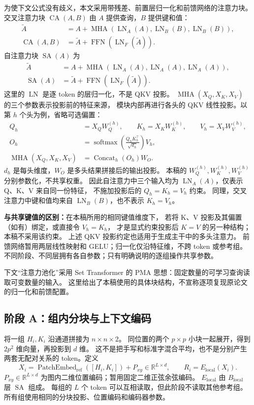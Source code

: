 \documentclass[UTF8,fontset=fandol,zihao=5,a4paper]{ctexart}
\newcommand{\R}{\mathbb R}
\newcommand{\LN}{\operatorname{LN}}
\newcommand{\SA}{\operatorname{SA}}
\newcommand{\CA}{\operatorname{CA}}
\newcommand{\FFN}{\operatorname{FFN}}
\newcommand{\MHA}{\operatorname{MHA}}
\begin{document}
为使下文公式没有歧义，本文采用带残差、前置层归一化和前馈网络的注意力块。
交叉注意力块 $\CA(A,B)$ 由 $A$ 提供查询，$B$ 提供键和值：
\begin{align*}
\widetilde A&=A+\MHA(\LN_A(A),\LN_B(B),\LN_B(B)),\\
\CA(A,B)&=\widetilde A+\FFN(\LN_F(\widetilde A)).
\end{align*}
自注意力块 $\SA(A)$ 为
\begin{align*}
\widetilde A&=A+\MHA(\LN_A(A),\LN_A(A),\LN_A(A)),\\
\SA(A)&=\widetilde A+\FFN(\LN_F(\widetilde A)).
\end{align*}
这里的 $\LN$ 是逐 token 的层归一化，不是 QKV 投影。
$\MHA(X_Q,X_K,X_V)$ 的三个参数表示投影前的特征来源，
模块内部再进行各头的 QKV 线性投影。以第 $h$ 个头为例，省略可选偏置：
\begin{align*}
Q_h&=X_QW_Q^{(h)},\qquad
K_h=X_KW_K^{(h)},\qquad
V_h=X_VW_V^{(h)},\\
O_h&=\operatorname{softmax}\!\left(\frac{Q_hK_h^\top}{\sqrt{d_h}}\right)V_h,\\
\MHA(X_Q,X_K,X_V)&=\operatorname{Concat}_h(O_h)W_O.
\end{align*}
$d_h$ 是每头维度，$W_O$ 是多头结果拼接后的输出投影。
本稿的 $W_Q^{(h)},W_K^{(h)},W_V^{(h)}$ 分别参数化，不共享权重。
因此自注意力中三个输入均为 $\LN_A(A)$，仅表示 Q、K、V 来自同一份特征，
不施加投影后的 $Q_h=K_h=V_h$ 约束。
同理，交叉注意力中键和值均来自 $\LN_B(B)$，也不表示 $K_h=V_h$。

\textbf{与共享键值的区别：}在本稿所用的相同键值维度下，
若将 K、V 投影及其偏置（如有）绑定，或直接令 $V_h=K_h$，
才是显式约束投影后 $K=V$ 的另一种结构；本稿不采用该约束。
上述 QKV 投影约定也适用于生成主干中的多头注意力。
前馈网络暂用两层线性映射和 GELU；归一化仅沿特征维，不跨 token 或参考组。
不同阶段、不同层拥有各自参数；只有明确说明的逐组操作共享参数。

下文“注意力池化”采用 Set Transformer 的 PMA 思想：固定数量的可学习查询读取可变数量的输入。
这里给出了本稿使用的具体块结构，不宣称逐项复现原论文的归一化和前馈配置。

\subsection{阶段 A：组内分块与上下文编码}

将一组 $H_i,K_i$ 沿通道拼接为 $n\times n\times2$。
同位置的两个 $p\times p$ 小块一起展开，得到 $2p^2$ 维向量，再投影到 $d$ 维。
这不是把手写和标准字混合平均，也不是分别产生两套无配对关系的 token。定义
\[
X_i=\operatorname{PatchEmbed}_{\mathrm{ref}}([H_i,K_i])+P_{xy}
\in\R^{L\times d},\qquad
R_i=E_{\mathrm{local}}(X_i).
\]
$P_{xy}\in\R^{L\times d}$ 为图内二维位置编码；暂用固定二维正弦余弦编码。
$E_{\mathrm{local}}$ 由 $B_{\mathrm{local}}$ 层 $\SA$ 组成。
每组的 $L$ 个 token 可以互相读取，但此阶段不读取其他参考组。
所有组使用相同的分块投影、位置编码和编码器参数。
\end{document}
